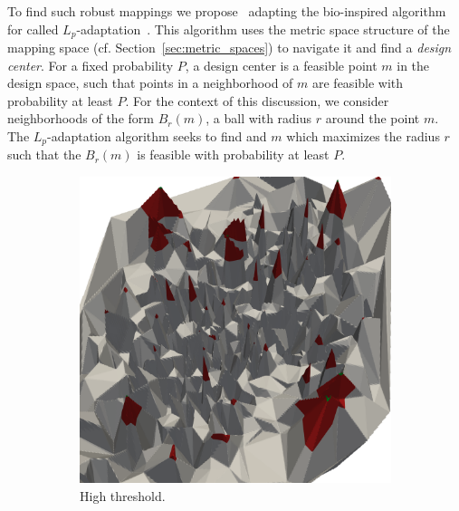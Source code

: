To find such robust mappings we propose~\cite{hempel_scopes17} adapting the bio-inspired algorithm for called $L_p$-adaptation~\cite{asmus2017lp}.
This algorithm uses the metric space structure of the mapping space (cf. Section~\ref{sec:metric_spaces}) to navigate it and find a \emph{design center}.
For a fixed probability $P$, a design center is a feasible point $m$ in the design space, such that points in a neighborhood of $m$ are feasible with probability at least $P$.
For the context of this discussion, we consider neighborhoods of the form $B_r(m)$, a ball with radius $r$ around the point $m$.
The $L_p$-adaptation algorithm seeks to find and $m$ which maximizes the radius $r$ such that the $B_r(m)$ is feasible with probability at least $P$.
\begin{figure}[t]
  \centering
	\begin{subfigure}[b]{0.33\textwidth}
    \includegraphics[width=\textwidth]{figures/coolidge-af-high-threshold.png}
		\caption{High threshold.}
		\label{fig:lvars-bench-cores}
	\end{subfigure}
	~
	\begin{subfigure}[b]{0.33\textwidth}

\end{subfigure}
\end{figure}
